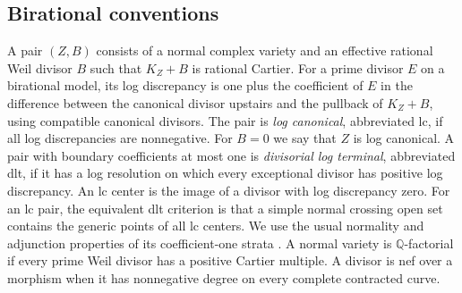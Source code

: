 \subsection{Birational conventions}
A pair $(Z,B)$ consists of a normal complex variety and an effective rational
Weil divisor $B$ such that $K_Z+B$ is rational Cartier.  For a prime divisor
$E$ on a birational model, its log discrepancy is one plus the coefficient
of $E$ in the difference between the canonical divisor upstairs and the
pullback of $K_Z+B$, using compatible canonical divisors.  The pair is
\emph{log canonical}, abbreviated lc, if all log discrepancies are nonnegative.
For $B=0$ we say that $Z$ is log canonical.  A pair with boundary coefficients
at most one is \emph{divisorial log terminal}, abbreviated dlt, if it has a
log resolution on which every exceptional divisor has positive log
discrepancy.  An lc center is the image of a divisor with log discrepancy zero.
For an lc pair, the equivalent dlt criterion is that a simple
normal crossing open set contains the generic points of all lc centers.
We use the usual normality and adjunction properties of its coefficient-one strata
\cite[11.5--11.15]{Kollar2023Families}.
A normal variety is $\mathbb Q$-factorial if every prime Weil divisor has a
positive Cartier multiple.  A divisor is nef over a morphism when it has
nonnegative degree on every complete contracted curve.
